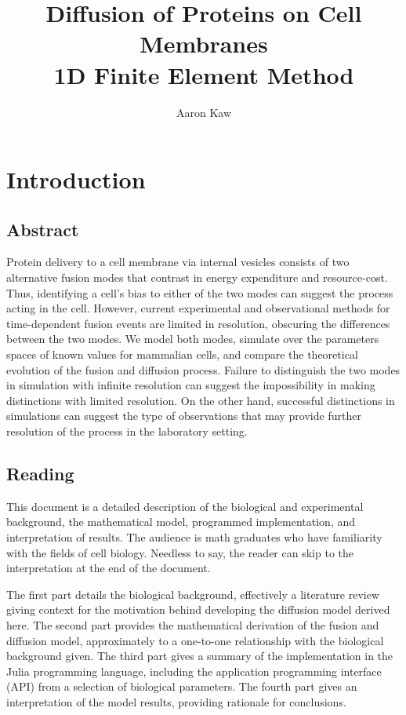 \documentclass{report}
\title{Diffusion of Proteins on Cell Membranes \\ 1D Finite Element Method}
\author{Aaron Kaw}
\date{}
\begin{document}
\maketitle
\tableofcontents

\chapter{Introduction}
\section{Abstract}
Protein delivery to a cell membrane via internal vesicles consists of two alternative fusion modes that contrast in energy expenditure and resource-cost. Thus, identifying a cell's bias to either of the two modes can suggest the process acting in the cell. However, current experimental and observational methods for time-dependent fusion events are limited in resolution, obscuring the differences between the two modes. We model both modes, simulate over the parameters spaces of known values for mammalian cells, and compare the theoretical evolution of the fusion and diffusion process. Failure to distinguish the two modes in simulation with infinite resolution can suggest the impossibility in making distinctions with limited resolution. On the other hand, successful distinctions in simulations can suggest the type of observations that may provide further resolution of the process in the laboratory setting.

\section{Reading}
This document is a detailed description of the biological and experimental background, the mathematical model, programmed implementation, and interpretation of results. The audience is math graduates who have familiarity with the fields of cell biology. Needless to say, the reader can skip to the interpretation at the end of the document.

The first part details the biological background, effectively a literature review giving context for the motivation behind developing the diffusion model derived here.
The second part provides the mathematical derivation of the fusion and diffusion model, approximately to a one-to-one relationship with the biological background given.
The third part gives a summary of the implementation in the Julia programming language, including the application programming interface (API) from a selection of biological parameters.
The fourth part gives an interpretation of the model results, providing rationale for conclusions.
\end{document}
